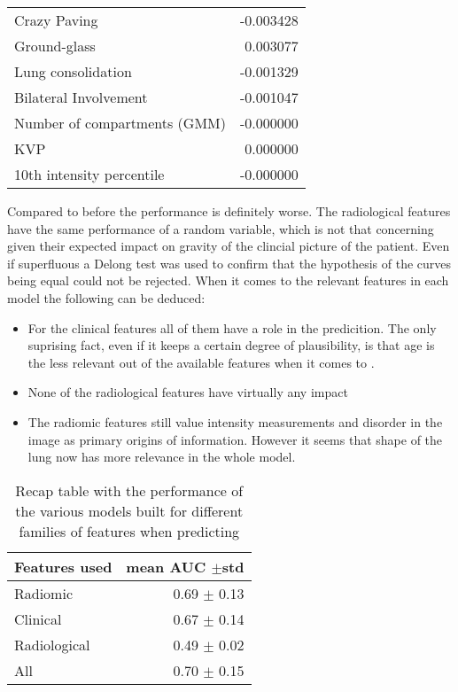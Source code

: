\begin{table}
\begin{tabular}{lr}
		Crazy Paving                        &                     -0.003428 \\
		Ground-glass                        &                      0.003077 \\
		Lung consolidation                  &                     -0.001329 \\
		Bilateral Involvement               &                     -0.001047 \\
		Number of compartments (GMM)        &                     -0.000000 \\
		KVP                                 &                      0.000000 \\
		10th intensity percentile           &                     -0.000000 \\
		\bottomrule
		\end{tabular}
\end{table}

Compared to before the performance is definitely worse. The radiological features have the same performance of a random variable, which is not that concerning given their expected impact on gravity of the clincial picture of the patient. Even if superfluous a Delong test was used to confirm that the hypothesis of the curves being equal could not be rejected. When it comes to the relevant features in each model the following can be deduced:

\begin{itemize}
\item For the clinical features all of them have a role in the predicition. The only suprising fact, even if it keeps a certain degree of plausibility, is that age is the less relevant out of the available features when it comes to \icu.
\item None of the radiological features have virtually any impact
\item The radiomic features still value intensity measurements and disorder in the image as primary origins of information. However it seems that shape of the lung now has more relevance in the whole model.
\end{itemize}

\begin{table}
\caption{Recap table with the performance of the various models built for different families of features when predicting \icu \label{tab:RecapICU}}
\centering
\begin{tabular}{l|r}
\toprule
Features used & mean AUC $\pm$std\\
\midrule
Radiomic  & 0.69 $\pm$ 0.13\\
Clinical  &  0.67 $\pm$ 0.14\\
Radiological & 0.49 $\pm$ 0.02\\
All & 0.70 $\pm$ 0.15 \\
\bottomrule
\end{tabular}
\end{table}


